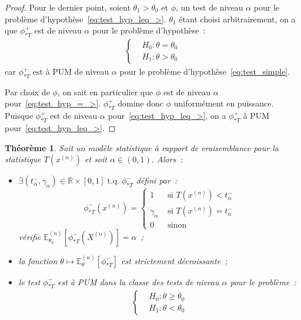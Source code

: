 \documentclass{report}
\DeclareMathOperator{\tq}{\text{ t.q. }}
\newcommand{\E}{\mathbb E}
\newcommand{\R}{\mathbb R}
\newcommand{\n}{{(n)}}
\newcommand{\Xn}{{X^\n}}
\newtheorem{thm}{Théorème}[chapter]
\theoremstyle{definition}
\theoremstyle{remark}
\begin{document}
\begin{proof}
		Pour le dernier point, soient $\theta_1 > \theta_0$ et $\phi$, un test de niveau $\alpha$ pour le problème d'hypothèse~\eqref{eq:test_hyp_leq_>}.
		$\theta_1$ étant choisi arbitrairement, on a que $\phi_{*T}^+$ est de niveau $\alpha$ pour le problème d'hypothèse~:
		\begin{align}\label{eq:test_hyp_=_>}
			\begin{cases}
				&H_0 : \theta = \theta_0 \\
				&H_1 : \theta > \theta_0
			\end{cases}
		\end{align}
		car $\phi_{*T}^+$ est à PUM de niveau $\alpha$ pour le problème d'hypothèse~\eqref{eq:test_simple}.

		Par choix de $\phi$, on sait en particulier que $\phi$ est de niveau $\alpha$ pour~\eqref{eq:test_hyp_=_>}. $\phi_{*T}^+$ domine donc $\phi$ uniformément
		en puissance. Puisque $\phi_{*T}^+$ est de niveau $\alpha$ pour~\eqref{eq:test_hyp_leq_>}, on a $\phi_{*T}^+$ à PUM pour~\eqref{eq:test_hyp_leq_>}.
		\end{proof}

		\begin{thm} Soit un modèle statistique à rapport de vraisemblance pour la statistique $T(x^\n)$ et soit $\alpha \in (0, 1)$. Alors~:
		\begin{itemize}
			\item $\exists (t_\alpha^-, \gamma_\alpha) \in \R \times [0, 1] \tq \phi_{*T}^-$ défini par~:
			\[\phi_{*T}^-(x^\n) =
			\begin{cases}
				1 &\text{ si } T(x^\n) < t_\alpha^- \\
				\gamma_\alpha &\text{ si } T(x^\n) = t_\alpha^- \\
				0 &\text{ sinon}
			\end{cases}\]
			vérifie $\E_{\theta_0}^\n[\phi_{*T}^-(\Xn)] = \alpha$~;
			\item la fonction $\theta \mapsto \E_\theta^\n[\phi_{*T}^-]$ est strictement décroissante~;
			\item le test $\phi_{*T}^-$ est à PUM dans la classe des tests de niveau $\alpha$ pour le problème~:
			\begin{align}\label{eq:test_hyp_geq_<}
				\begin{cases}
					&H_0 : \theta \geq \theta_0 \\
					&H_1 : \theta < \theta_0
				\end{cases}
			\end{align}
		\end{itemize}
		\end{thm}
\end{document}
